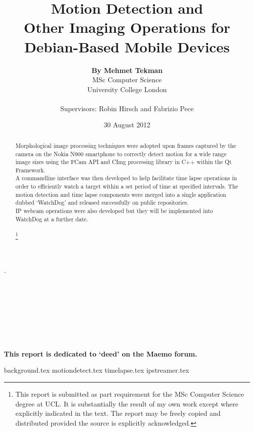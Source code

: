 \documentclass[11pt]{article} %
\title{\Huge Motion Detection and\\Other Imaging Operations for\\Debian-Based Mobile Devices }
\date{30 August 2012}
\author{{\bf By Mehmet Tekman}\\\small MSc Computer Science\\\small University College London\\\\
\large Supervisors: Robin Hirsch and Fabrizio Pece}
\newcommand{\tab}{\hspace*{2em}}
\begin{document}
\maketitle 

\part*{}{\tiny.\\\\\\\\\\\\\\\\}
\begin{abstract}
Morphological image processing techniques were adopted upon frames captured by the camera on the Nokia N900 smartphone to correctly detect motion for a wide range image sizes using the FCam API and CImg processing library in C++ within the Qt Framework.\\\tab A commandline interface was then developed to help facilitate time lapse operations in order to efficiently watch a target within a set period of time at specified intervals. The motion detection and time lapse components were merged into a single application dubbed ‘WatchDog’ and released successfully on public repositories.\\\tab IP webcam operations were also developed but they will be implemented into WatchDog at a further date.
\\\\\let\thefootnote\relax\footnote{This report is submitted as part requirement for the MSc Computer Science degree at UCL. It is substantially the result of my own work except where explicitly indicated in the text. The report may be freely copied and distributed provided the source is explicitly acknowledged.}
\end{abstract}
\pagebreak
\tableofcontents
\begin{center}
\vspace*{\fill}\small{\bf This report is dedicated to ‘deed’ on the Maemo forum.}
\end{center}
\pagebreak

{background.tex}
{motiondetect.tex}
{timelapse.tex}
{ipstreamer.tex}
\end{document}
